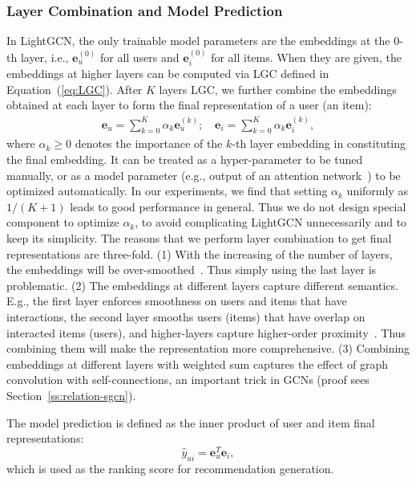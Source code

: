\documentclass[sigconf]{acmart}
\theoremstyle{definition}
\begin{document}
\subsubsection{Layer Combination and Model Prediction} In LightGCN, the only trainable model parameters are the embeddings at the 0-th layer, i.e., $\textbf{e}_{u}^{(0)}$ for all users and  $\textbf{e}_{i}^{(0)}$ for all items. When they are given, the embeddings at higher layers can be computed via LGC defined in Equation~(\ref{eq:LGC}). 
After $K$ layers LGC, we further combine the embeddings obtained at each layer to form the final representation of a user (an item):
\begin{equation}
\begin{aligned}
    \textbf{e}_{u} = \sum_{k=0}^K \alpha_k \textbf{e}_u^{(k)}; \quad \textbf{e}_{i} = \sum_{k=0}^K \alpha_k \textbf{e}_i^{(k)},
\end{aligned}
\end{equation}
where $\alpha_k \geq 0$ denotes the importance of the $k$-th layer embedding in constituting the final embedding. 
It can be treated as a hyper-parameter to be tuned manually, or as a model parameter (e.g., output of an attention network~\cite{ACF}) to be optimized automatically. In our experiments, we find that setting $\alpha_k$ uniformly as $1 / (K+1)$ leads to good performance in general. Thus we do not design special component to optimize $\alpha_k$, to avoid complicating LightGCN unnecessarily and to keep its simplicity.  
The reasons that we perform layer combination to get final representations are three-fold. (1) With the increasing of the number of layers, the embeddings will be over-smoothed~\cite{DeepInsights}. Thus simply using the last layer is problematic. (2) The embeddings at different layers capture different semantics. E.g., the first layer enforces smoothness on users and items that have interactions, the second layer smooths users (items) that have overlap on interacted items (users), and higher-layers capture higher-order proximity~\cite{NGCF}. Thus combining them will make the representation more comprehensive. (3) Combining embeddings at different layers with weighted sum captures the effect of graph convolution with self-connections, an important trick in GCNs (proof sees Section~\ref{ss:relation-sgcn}).

The model prediction is defined as the inner product of user and item final representations: 
\begin{equation}
    \hat{y}_{ui} = \textbf{e}_u ^T \textbf{e}_i,
\end{equation}
which is used as the ranking score for recommendation generation. 
\end{document}
